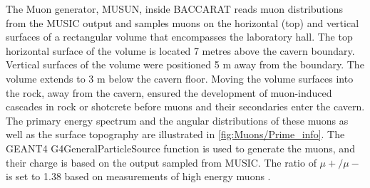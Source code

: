 The Muon generator, MUSUN, inside BACCARAT reads muon distributions from the MUSIC output and samples muons on the horizontal (top) and vertical surfaces of a rectangular volume that encompasses the laboratory hall. The top horizontal surface of the volume is located 7 metres above the cavern boundary. Vertical surfaces of the volume were positioned 5 m away from the boundary. The volume extends to 3 m below the cavern floor. Moving the volume surfaces into the rock, away from the cavern, ensured the development of muon-induced cascades in rock or shotcrete before muons and their secondaries enter the cavern. The primary energy spectrum and the angular distributions of these muons as well as the surface topography are illustrated in \autoref{fig:Muons/Prime_info}. The GEANT4 {\selectfont G4GeneralParticleSource} function is used to generate the muons, and their charge is based on the output sampled from MUSIC. The ratio of $\mu+/\mu-$ is set to 1.38 based on measurements of high energy muons \cite{Ashley:1975uj}.
